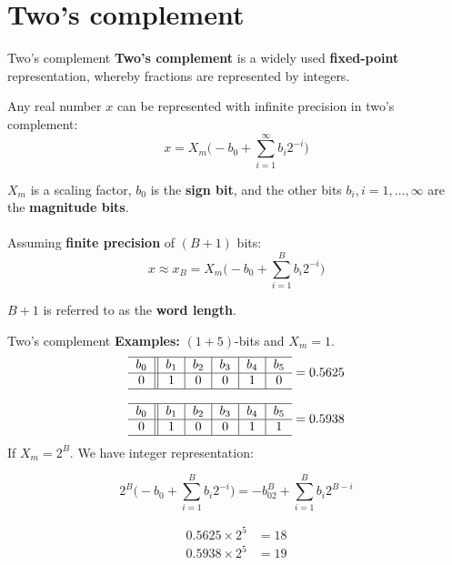 \documentclass[10pt]{beamer}
\begin{document}
%
\section{Two's complement}
\begin{frame}{Two's complement}
\textbf{Two's complement} is a widely used \textbf{fixed-point} representation, whereby fractions are represented by integers.

Any real number $x$ can be represented with infinite precision in two's complement:
\begin{equation*}
x = X_m\bigg(-b_0 + \sum_{i=1}^{\infty}b_i2^{-i}\bigg) \tag{infinite precision}
\end{equation*}

$X_m$ is a scaling factor, $b_0$ is the \textbf{sign bit}, and the other bits $b_i, i = 1, \ldots, \infty$ are the \textbf{magnitude bits}.
~\\
~\\

\pause
Assuming \textbf{finite precision} of $(B+1)$ bits: 
\begin{equation}
x \approx x_B=  X_m\bigg(-b_0 + \sum_{i=1}^{B}b_i2^{-i}\bigg) \tag{$B+1$ bits precision}
\end{equation}

$B+1$ is referred to as the \textbf{word length}.
\end{frame}

%
\begin{frame}{Two's complement}
\textbf{Examples:} $(1+5)$-bits and $X_m = 1$. 
\begin{equation*}
\begin{tabular}{c||c|c|c|c|c}
\hline
$b_0$ & $b_1$ & $b_2$ & $b_3$ & $b_4$ & $b_5$ \\
\hline
$0$ & $1$ & $0$ & $0$ & $1$ & $0$ \\
\hline
\end{tabular} = 0.5625
\end{equation*}

\begin{equation*}
	\begin{tabular}{c||c|c|c|c|c}
	\hline
	$b_0$ & $b_1$ & $b_2$ & $b_3$ & $b_4$ & $b_5$ \\
	\hline
	$0$ & $1$ & $0$ & $0$ & $1$ & $1$ \\
	\hline
	\end{tabular} = 0.5938
\end{equation*}
If $X_m = 2^B$. We have integer representation:  

\begin{equation*}
	2^B\bigg(-b_0 + \sum_{i=1}^{B}b_i2^{-i}\bigg) = -b_02^B + \sum_{i=1}^{B}b_i2^{B-i}
\end{equation*}

\begin{align*}
	0.5625\times 2^5 &= 18 \\
	0.5938\times 2^5 &= 19
\end{align*}
\end{frame}
\end{document}
